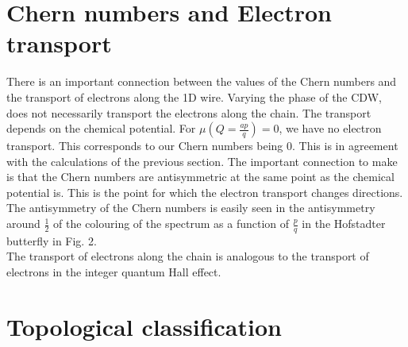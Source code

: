 \documentclass[letterpaper, 10 pt, conference]{ieeeconf}  %
\begin{document}
\section{Chern numbers and Electron transport}
There is an important connection between the values of the Chern numbers
and the transport of electrons along the 1D wire.
Varying the phase of the CDW, does not necessarily transport the electrons along the chain.
The transport depends on the chemical potential.
For $\mu(Q=\frac{ap}{q}) = 0$, we have no electron transport.
This corresponds to our Chern numbers being $0$.
This is in agreement with the calculations of the previous section.
The important connection to make is that the Chern numbers are antisymmetric at the same point as the chemical potential is.
This is the point for which the electron transport changes directions.
The antisymmetry of the Chern numbers is easily seen in the antisymmetry around $\frac{1}{2}$ of the colouring of the spectrum as a function of $\frac{p}{q}$ in the Hofstadter butterfly in Fig. 2.\\
The transport of electrons along the chain is analogous to the transport of electrons in the integer quantum Hall effect.

\section{Topological classification}
\end{document}
